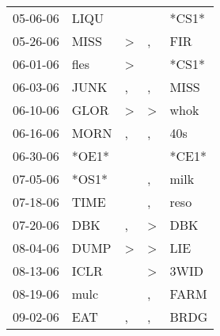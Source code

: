 \begin{supertabular}{p{0.07\textwidth}p{0.06\textwidth}p{0.02\textwidth}p{0.02\textwidth}p{0.06\textwidth}}
 05-06-06\textsuperscript{} &           LIQU\textsuperscript{} &                  &               &                            *CS1* \\
 05-26-06\textsuperscript{} &           MISS\textsuperscript{} &     \textgreater &             , &            FIR\textsuperscript{} \\
 06-01-06\textsuperscript{} &           fles\textsuperscript{} &     \textgreater &               &                            *CS1* \\
 06-03-06\textsuperscript{} &           JUNK\textsuperscript{} &                , &             , &           MISS\textsuperscript{} \\
 06-10-06\textsuperscript{} &           GLOR\textsuperscript{} &     \textgreater &  \textgreater &           whok\textsuperscript{} \\
 06-16-06\textsuperscript{} &           MORN\textsuperscript{} &                , &             , &            40s\textsuperscript{} \\
 06-30-06\textsuperscript{} &                            *OE1* &                  &               &                            *CE1* \\
 07-05-06\textsuperscript{} &                            *OS1* &                  &             , &           milk\textsuperscript{} \\
 07-18-06\textsuperscript{} &           TIME\textsuperscript{} &                  &             , &           reso\textsuperscript{} \\
 07-20-06\textsuperscript{} &            DBK\textsuperscript{} &                , &  \textgreater &            DBK\textsuperscript{} \\
 08-04-06\textsuperscript{} &           DUMP\textsuperscript{} &     \textgreater &  \textgreater &            LIE\textsuperscript{} \\
 08-13-06\textsuperscript{} &           ICLR\textsuperscript{} &                  &  \textgreater &           3WID\textsuperscript{} \\
 08-19-06\textsuperscript{} &           mulc\textsuperscript{} &                  &             , &           FARM\textsuperscript{} \\
 09-02-06\textsuperscript{} &            EAT\textsuperscript{} &                , &             , &           BRDG\textsuperscript{} \\

\end{supertabular}

